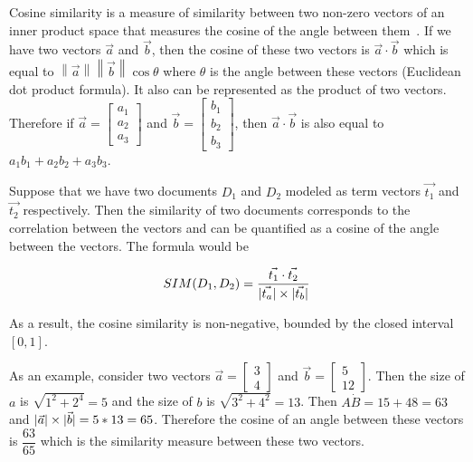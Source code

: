 \documentclass[11pt]{article}
\DeclarePairedDelimiter\abs{\lvert}{\rvert}               %
\begin{document}
\bigskip

Cosine similarity is a measure of similarity between two non-zero vectors of an
inner product space that measures the cosine of the angle between
them~\cite{wikicosine}. If we have two vectors \(\vec{a}\) and \(\vec{b}\), then the cosine of
these two vectors is \(\vec{a} \cdot \vec{b}\) which is equal to
\(\left\|\vec{a}\right\|\left\|\vec{b}\right\|\cos\theta\) where \(\theta\) is the angle
between these vectors (Euclidean dot product formula). It also can be
represented as the product of two vectors. Therefore if
\(\vec{a} = \begin{bmatrix}a_1 \\ a_2 \\ a_3\end{bmatrix}\) and
\(\vec{b} = \begin{bmatrix}b_1 \\ b_2 \\ b_3\end{bmatrix}\), then
\(\vec{a} \cdot \vec{b}\) is also equal to \(a_1b_1 + a_2b_2 + a_3b_3\).

\bigskip

Suppose that we have two documents \(D_1\) and \(D_2\) modeled as term vectors
\(\vec{t_1}\) and \(\vec{t_2}\) respectively.  Then the similarity of two documents
corresponds to the correlation between the vectors and can be quantified as a
cosine of the angle between the vectors.  The formula would be

\[SIM(D_1, D_2) = \dfrac{\vec{t_1} \cdot \vec{t_2}}{\abs{\vec{t_a}} \times
    \abs{\vec{t_b}}}\]

As a result, the cosine similarity is non-negative, bounded by the closed
interval \([0,1]\).

\bigskip

As an example, consider two vectors \(\vec{a} = \begin{bmatrix}3 \\ 4\end{bmatrix}\)
and \(\vec{b} = \begin{bmatrix}5 \\ 12\end{bmatrix}\). Then the size of \(a\) is
\(\sqrt{1^2 + 2^4} = 5\) and the size of \(b\) is \(\sqrt{3^2 + 4^2} = 13\).
Then \(A \dot B = 15 + 48 = 63\) and
\(\abs{\vec{a}} \times \abs{\vec{b}} = 5 * 13 = 65\). Therefore
the cosine of an angle between these vectors is \(\dfrac{63}{65}\) which is the
similarity measure between these two vectors.


\printbibliography[heading=bibintoc]

\end{document}
